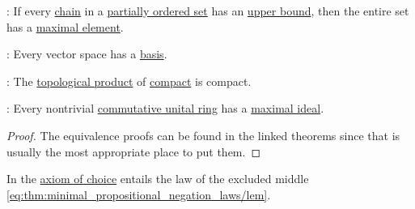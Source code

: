 \begin{theorem}
\begin{thmenum}[resume=thm:axiom_of_choice_equivalences]
     : If every \hyperref[def:partially_ordered_set_chain_and_antichain]{chain} in a \hyperref[def:partially_ordered_set]{partially ordered set} has an \hyperref[def:partially_ordered_set_extremal_points/upper_and_lower_bounds]{upper bound}, then the entire set has a \hyperref[def:partially_ordered_set_extremal_points/maximal_and_minimal_element]{maximal element}.

     : Every vector space has a \hyperref[def:left_module_hamel_basis]{basis}.

     : The \hyperref[def:topological_product]{topological product} of \hyperref[def:compact_space]{compact} is compact.

     : Every nontrivial \hyperref[def:semiring/commutative_unital_ring]{commutative unital ring} has a \hyperref[def:maximal_ring_ideal]{maximal ideal}.
  \end{thmenum}
\end{theorem}
\begin{proof}
  The equivalence proofs can be found in the linked theorems since that is usually the most appropriate place to put them.
\end{proof}

\begin{theorem}\label{thm:diaconescu_goodman_myhill_theorem}
  In \hyperref[def:zfc]{} the \hyperref[def:zfc/choice]{axiom of choice} entails the law of the excluded middle \eqref{eq:thm:minimal_propositional_negation_laws/lem}.
\end{theorem}
